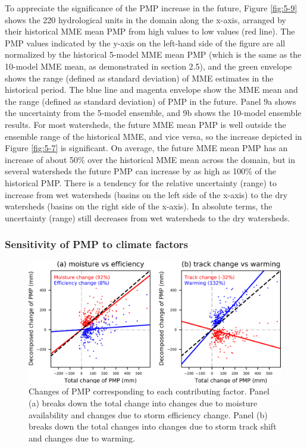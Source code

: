 To appreciate the significance of the PMP increase in the future, Figure \ref{fig:5-9} shows the 220 hydrological units in the domain along the x-axis, arranged by their historical MME mean PMP from high values to low values (red line). The PMP values indicated by the y-axis on the left-hand side of the figure are all normalized by the historical 5-model MME mean PMP (which is the same as the 10-model MME mean, as demonstrated in section 2.5), and the green envelope shows the range (defined as standard deviation) of MME estimates in the historical period. The blue line and magenta envelope show the MME mean and the range (defined as standard deviation) of PMP in the future. Panel 9a shows the uncertainty from the 5-model ensemble, and 9b shows the 10-model ensemble results. For most watersheds, the future MME mean PMP is well outside the ensemble range of the historical MME, and vice versa, so the increase depicted in Figure \ref{fig:5-7} is significant. On average, the future MME mean PMP has an increase of about 50\% over the historical MME mean across the domain, but in several watersheds the future PMP can increase by as high as 100\% of the historical PMP. There is a tendency for the relative uncertainty (range) to increase from wet watersheds (basins on the left side of the x-axis) to the dry watersheds (basins on the right side of the x-axis). In absolute terms, the uncertainty (range) still decreases from wet watersheds to the dry watersheds.

\subsubsection{Sensitivity of PMP to climate factors}

\begin{figure}[htbp]
	\includegraphics[width=\linewidth]{pics/ch5/fig10.png}
	\caption{Changes of PMP corresponding to each contributing factor. Panel (a) breaks down the total change into changes due to moisture availability and changes due to storm efficiency change. Panel (b) breaks down the total changes into changes due to storm track shift and changes due to warming.}
	\label{fig:5-10}
\end{figure}

